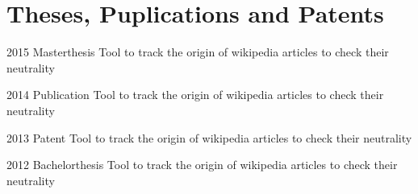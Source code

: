 \documentclass[a4paper]{friggeri-cv}
\begin{document}
\section{Theses, Puplications and Patents}
\begin{entrylist}
	\entry
	 {2015}
    {Masterthesis}
    {}
    {Tool to track the origin of wikipedia articles to check their neutrality}
\end{entrylist}
\begin{entrylist}
	\entry
	 {2014}
    {Publication}
    {}
    {Tool to track the origin of wikipedia articles to check their neutrality}
\end{entrylist}
\begin{entrylist}
	\entry
	 {2013}
    {Patent}
    {}
    {Tool to track the origin of wikipedia articles to check their neutrality}
\end{entrylist}
\begin{entrylist}
	\entry
	 {2012}
    {Bachelorthesis}
    {}
    {Tool to track the origin of wikipedia articles to check their neutrality}
\end{entrylist}





\end{document}
